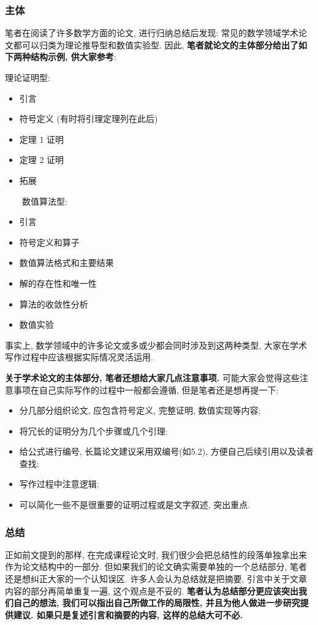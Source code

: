 \documentclass{formatBook}
\newcommand{\XG}[1]{\textcolor{red}{#1}}
\begin{document}
\subsubsection{主体}
笔者在阅读了许多数学方面的论文, 进行归纳总结后发现: 常见的数学领域学术论文都可以归类为理论推导型和数值实验型. 因此, \textbf{笔者就论文的主体部分给出了如下两种结构示例, 供大家参考}:
\begin{multicols}{2}
    理论证明型:
    \begin{itemize}
        \item 引言
        \item 符号定义 (有时将引理定理列在此后)
        \item 定理 1 证明
        \item 定理 2 证明
        \item 拓展
    \end{itemize}
    \ \ \ \   数值算法型:
    \begin{itemize}
        \item 引言
        \item 符号定义和算子
        \item 数值算法格式和主要结果
        \item 解的存在性和唯一性
        \item 算法的收敛性分析
        \item 数值实验
    \end{itemize}
\end{multicols}
\par 事实上, 数学领域中的许多论文或多或少都会同时涉及到这两种类型, 大家在学术写作过程中应该根据实际情况灵活运用.
\par \textbf{关于学术论文的主体部分, 笔者还想给大家几点注意事项.} 可能大家会觉得这些注意事项在自己实际写作的过程中一般都会遵循, 但是笔者还是想再提一下:
\begin{itemize}
    \item 分几部分组织论文, 应包含符号定义, 完整证明, 数值实现等内容\XG{;}
    \item 将冗长的证明分为几个步骤或几个引理\XG{;}
    \item 给公式进行编号, 长篇论文建议采用双编号(如5.2), 方便自己后续引用以及读者查找\XG{;}
    \item 写作过程中注意逻辑\XG{;}
    \item 可以简化一些不是很重要的证明过程或是文字叙述, 突出重点\XG{.}
\end{itemize}
\subsubsection{总结}
正如前文提到的那样, 在完成课程论文时, 我们很少会把总结性的段落单独拿出来作为论文结构中的一部分. 但如果我们的论文确实需要单独的一个总结部分, 笔者还是想纠正大家的一个认知误区. 许多人会认为总结就是把摘要, 引言中关于文章内容的部分再简单重复一遍, 这个观点是不妥的. \textbf{笔者认为总结部分更应该突出我们自己的想法, 我们可以指出自己所做工作的局限性, 并且为他人做进一步研究提供建议. 如果只是复述引言和摘要的内容, 这样的总结大可不必.}
\end{document}
